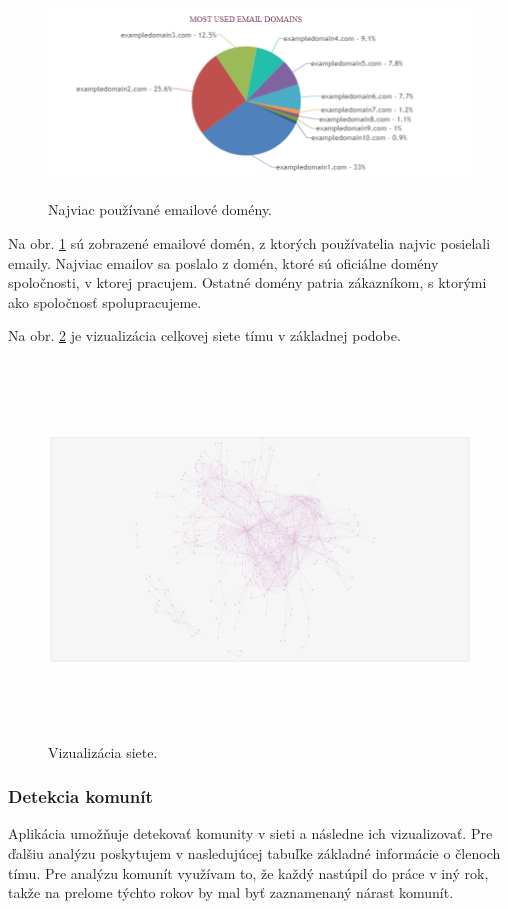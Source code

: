 \documentclass[slovak,master,public,dept460,male,cpdeclaration,oneside]{diploma}
\begin{document}
\begin{figure}[H]
\centering
\includegraphics[width=14.5cm, height=5.5cm]{figures/team_domain_celkovo}
\caption{Najviac používané emailové domény.}
\label{team_domain_celkovo}
\end{figure}

Na obr. \ref{team_domain_celkovo} sú zobrazené emailové domén, z ktorých používatelia najvic posielali emaily. Najviac emailov sa poslalo z domén, ktoré sú oficiálne domény spoločnosti, v ktorej pracujem. Ostatné domény patria zákazníkom, s ktorými ako spoločnosť spolupracujeme. 

Na obr. \ref{team_net_celkovo} je vizualizácia celkovej siete tímu v základnej podobe.


\begin{figure}[H]
\centering
\includegraphics[width=16cm, height=10cm]{figures/team_net_celkovo}
\caption{Vizualizácia siete.}
\label{team_net_celkovo}
\end{figure}


\subsubsection{Detekcia komunít}
Aplikácia umožňuje detekovať komunity v sieti a následne ich vizualizovať. Pre ďalšiu analýzu poskytujem v nasledujúcej tabuľke základné informácie o členoch tímu. Pre analýzu komunít využívam to, že každý nastúpil do práce v iný rok, takže na prelome týchto rokov by mal byť zaznamenaný nárast komunít.
\end{document}
